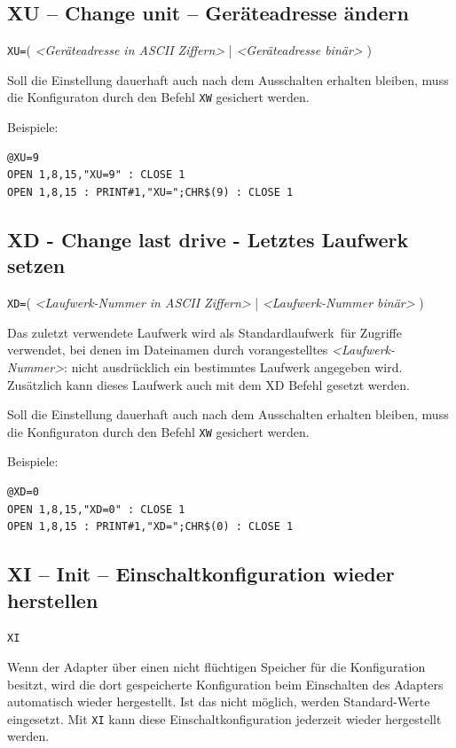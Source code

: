 \documentclass[10pt,a4paper]{scrartcl}		%
\begin{document}
\subsection{XU -- Change unit -- Geräteadresse ändern}

\texttt{XU=}\Big( \textit{<Geräteadresse in ASCII Ziffern>} \Big|
\textit{<Geräteadresse binär>} \Big)

Soll die Einstellung dauerhaft auch nach dem Ausschalten erhalten 
bleiben, muss die Konfiguraton durch den Befehl \texttt{XW} gesichert werden.

Beispiele:

\begin{verbatim}
@XU=9
OPEN 1,8,15,"XU=9" : CLOSE 1
OPEN 1,8,15 : PRINT#1,"XU=";CHR$(9) : CLOSE 1
\end{verbatim}

\subsection{XD - Change last drive - Letztes Laufwerk setzen}

\texttt{XD=}\Big( \textit{<Laufwerk-Nummer in ASCII Ziffern>} \Big|
\textit{<Laufwerk-Nummer binär>} \Big)

Das zuletzt verwendete Laufwerk wird als \glqq Standardlaufwerk\grqq\  für
Zugriffe verwendet, bei denen im Dateinamen durch vorangestelltes
\textit{<Laufwerk-Nummer>}: nicht ausdrücklich ein bestimmtes
Laufwerk angegeben wird.  
Zusätzlich kann dieses Laufwerk auch mit dem XD Befehl gesetzt werden.

Soll die Einstellung dauerhaft auch nach dem Ausschalten erhalten 
bleiben, muss die Konfiguraton durch den Befehl \texttt{XW} gesichert werden.

Beispiele:

\begin{verbatim}
@XD=0
OPEN 1,8,15,"XD=0" : CLOSE 1
OPEN 1,8,15 : PRINT#1,"XD=";CHR$(0) : CLOSE 1
\end{verbatim}

\subsection{XI -- Init -- Einschaltkonfiguration wieder herstellen}

\texttt{XI}

Wenn der Adapter über einen nicht flüchtigen Speicher für die
Konfiguration besitzt, wird die dort gespeicherte Konfiguration beim
Einschalten des Adapters automatisch wieder hergestellt. 
Ist das nicht möglich, werden Standard-Werte eingesetzt.
Mit \texttt{XI} kann diese Einschaltkonfiguration jederzeit wieder
hergestellt werden.
\end{document}
